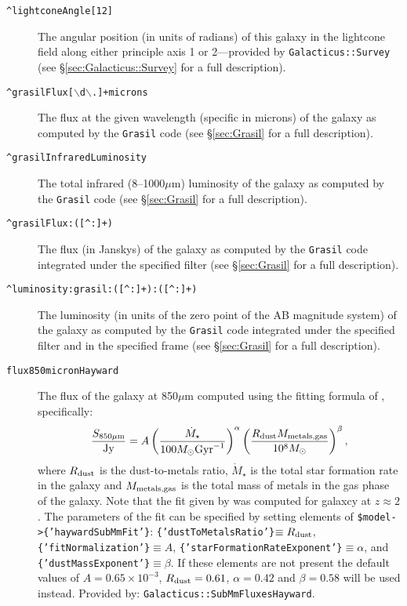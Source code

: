 \begin{description}
 \item[{\tt \textasciicircum lightconeAngle[12]}] The angular position (in units of radians) of this galaxy in the lightcone field along either principle axis 1 or 2---provided by {\tt Galacticus::Survey} (see \S\ref{sec:Galacticus::Survey} for a full description).
 \item[{\tt \textasciicircum grasilFlux[$\backslash$d$\backslash$.]+microns}] The flux at the given wavelength (specific in microns) of the galaxy as computed by the {\tt Grasil} code (see \S\ref{sec:Grasil} for a full description).
 \item[{\tt \textasciicircum grasilInfraredLuminosity}] The total infrared (8--1000$\mu$m) luminosity of the galaxy as computed by the {\tt Grasil} code (see \S\ref{sec:Grasil} for a full description).
 \item[{\tt \textasciicircum grasilFlux:([\textasciicircum :]+)}] The flux (in Janskys) of the galaxy as computed by the {\tt Grasil} code integrated under the specified filter (see \S\ref{sec:Grasil} for a full description).
 \item[{\tt \textasciicircum luminosity:grasil:([\textasciicircum :]+):([\textasciicircum :]+)}] The luminosity (in units of the zero point of the AB magnitude system) of the galaxy as computed by the {\tt Grasil} code integrated under the specified filter and in the specified frame (see \S\ref{sec:Grasil} for a full description).
 \item[{\tt flux850micronHayward}] The flux of the galaxy at 850$\mu$m computed using the fitting formula of \cite{hayward_what_2010}, specifically:
\begin{equation}
 {S_{850\mu{\rm m}} \over {\rm Jy}} = A \left({\dot{M}_\star \over 100 M_\odot \hbox{Gyr}^{-1}}\right)^\alpha \left({R_{\rm dust} M_{\rm metals,gas} \over 10^8 M_\odot}\right)^\beta,
\end{equation}
where $R_{\rm dust}$ is the dust-to-metals ratio, $\dot{M}_\star$ is the total star formation rate in the galaxy and $M_{\rm metals,gas}$ is the total mass of metals in the gas phase of the galaxy. Note that the fit given by \cite{hayward_what_2010} was computed for galaxcy at $z\approx 2$. The parameters of the fit can be specified by setting elements of {\tt \$model-\textgreater\{'haywardSubMmFit'\}}: {\tt \{'dustToMetalsRatio'\}}$\equiv R_{\rm dust}$, {\tt \{'fitNormalization'\}}$\equiv A$, {\tt \{'starFormationRateExponent'\}}$\equiv \alpha$, and {\tt \{'dustMassExponent'\}}$\equiv \beta$. If these elements are not present the default values of $A=0.65\times 10^{-3}$, $R_{\rm dust}=0.61$, $\alpha=0.42$ and $\beta = 0.58$ \cite{hayward_what_2010} will be used instead. Provided by: {\tt Galacticus::SubMmFluxesHayward}.

\end{description}
